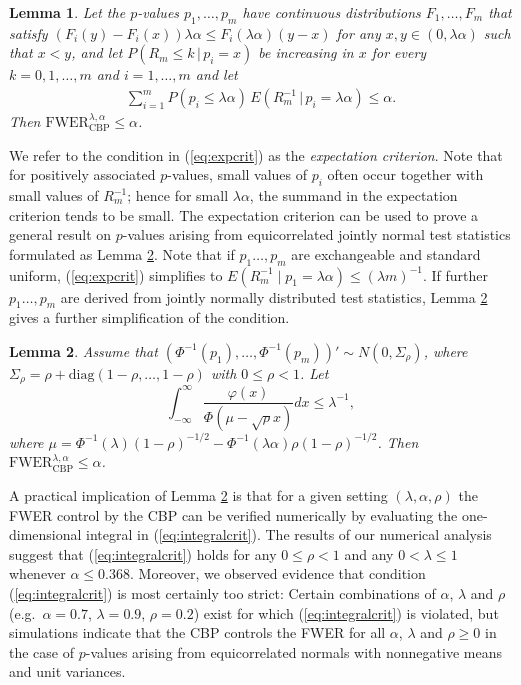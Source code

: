 \documentclass {imsart}
\newtheorem{lemma}{Lemma}
\renewcommand{\emph}[1]{\textsl{#1}}
\newcommand{\FWERcb}{\mathrm{FWER}_{\mathrm{CBP}}^{\lambda,\alpha}}
\newcommand{\diag}{\mathrm{diag}}
\begin{document}
\begin{lemma}
\label{lem:expcrit}
 Let the $p$-values $p_1,\ldots,p_m$ have continuous distributions $F_1,\ldots,F_m$ that satisfy $(F_i(y) - F_i(x))\lambda \alpha \leq F_i(\lambda \alpha)(y-x)$ for any $x, y \in (0,\lambda \alpha)$ such that $x < y$, and let $P(R_m \le k\,|\,p_i=x)$ be increasing in $x$ for every $k=0,1,\ldots,m$ and $i=1,\ldots,m$ and let
\begin{align}
\label{eq:expcrit}
\sum_{i=1}^{m}{P(p_i\le\lambda\alpha)\,E(R_m^{-1}\,|\,p_i=\lambda\alpha)\le\alpha}.
\end{align}
Then $\FWERcb\le\alpha$.
\end{lemma}

We refer to the condition in (\ref{eq:expcrit}) as the \emph{expectation criterion}. Note that for positively associated $p$-values, small values of $p_i$ often occur together with small values of $R_m^{-1}$; hence for small $\lambda \alpha$, the summand in the expectation criterion tends to be small. The expectation criterion can be used to prove a general result on $p$-values arising from equicorrelated jointly normal test statistics formulated as Lemma \ref{lem:equic_norm}. Note that if $p_1\ldots,p_m$ are exchangeable and standard uniform,  (\ref{eq:expcrit}) simplifies to $E(R_m^{-1}\mid p_1=\lambda\alpha)\le (\lambda m)^{-1}$. If further $p_1\ldots,p_m$ are derived from jointly normally distributed test statistics, Lemma \ref{lem:equic_norm} gives a further simplification of the condition.



\begin{lemma}
\label{lem:equic_norm}
Assume that $(\Phi^{-1}(p_1),\ldots, \Phi^{-1}(p_m))'\sim{}N(0,\Sigma_\rho)$, where $\Sigma_\rho=\rho+\diag(1-\rho,\ldots,1-\rho)$ with $0\leq\rho<1$. Let
\begin{equation}
\label{eq:integralcrit}
\int_{-\infty }^{\infty }{\frac{\varphi(x)}{\Phi (\mu-\sqrt{\rho}x)}dx}\leq\lambda^{-1},
\end{equation}
where $\mu=\Phi^{-1}(\lambda)(1-\rho)^{-1/2}-\Phi^{-1}(\lambda\alpha)\rho(1-\rho)^{-1/2}$. Then $\FWERcb\le\alpha$.
\end{lemma}

A practical implication of Lemma \ref{lem:equic_norm} is that for a given setting $(\lambda, \alpha, \rho)$ the FWER control by the CBP can be verified numerically by evaluating the one-dimensional integral in (\ref{eq:integralcrit}). The results of our numerical analysis suggest that (\ref{eq:integralcrit}) holds for any $0\leq\rho<1$ and any $0<\lambda\leq1$ whenever $\alpha\leq0.368$. Moreover, we observed evidence that condition (\ref{eq:integralcrit}) is most certainly too strict: Certain combinations of $\alpha$, $\lambda$ and $\rho$ (e.g.\ $\alpha=0.7$, $\lambda=0.9$, $\rho=0.2$) exist for which (\ref{eq:integralcrit}) is violated, but simulations indicate that the CBP controls the FWER for all $\alpha$, $\lambda$ and $\rho \geq 0$ in the case of $p$-values arising from equicorrelated normals with nonnegative means and unit variances.
\end{document}
